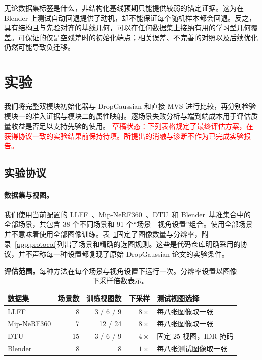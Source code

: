 \documentclass{article}
\newcommand{\PH}[1]{\textcolor{red}{#1}}
\begin{document}
无论数据集标签是什么，非结构化基线预期只能提供较弱的锚定证据。这为在 Blender 上测试自动回退提供了动机，却不能保证每个随机样本都会回退。反之，具有结构且与先验对齐的基线几何，可以在任何数据集上接纳有用的学习型几何覆盖。可保证的仅是空残差时的初始化端点；相关误差、不完善的对照以及后续优化仍然可能导致负迁移。

\section{实验}
\label{sec:exp}

我们将完整双模块初始化器与 DropGaussian 和直接 MVS 进行比较，再分别检验模块一的准入证据与模块二的属性映射。逐场景失败分析与端到端成本用于评估质量收益是否足以支持先验的使用。
\PH{草稿状态：下列表格规定了最终评估方案，在获得协议一致的实验结果前保持待填。所提出的消融与诊断不作为已完成实验报告。}

\subsection{实验协议}
\label{sec:protocol}

\paragraph{数据集与视图。}
我们使用当前配置的 LLFF~\citep{mildenhall2019llff}、Mip-NeRF360~\citep{barron2022mipnerf360}、DTU~\citep{jensen2014large}和 Blender~\citep{mildenhall2020nerf}基准集合中的全部场景，共包含 38 个不同场景和 91 个“场景—视角设置”组合。使用全部场景并不意味着使用全部图像训练。表~\ref{tab:protocol}固定了图像数量与分辨率，附录~\ref{app:protocol}列出了场景和精确的选图规则。这些是代码仓库明确采用的协议，并不声称每一种设置都复现了原始 DropGaussian 论文的实验条件。

\begin{table}[t]
\caption{\textbf{评估范围。}每种方法在每个场景与视角设置下运行一次。分辨率设置以图像下采样倍数表示。}
\label{tab:protocol}
\centering\small
\setlength{\tabcolsep}{4pt}
\begin{tabular}{@{}lrrrl@{}}
\toprule
数据集 & 场景数 & 训练视图数 & 下采样 & 测试视图选择\\
\midrule
LLFF & 8 & 3 / 6 / 9 & $8\times$ & 每八张图像取一张\\
Mip-NeRF360 & 7 & 12 / 24 & $8\times$ & 每八张图像取一张\\
DTU & 15 & 3 / 6 / 9 & $4\times$ & 固定 25 视图，IDR 掩码\\
Blender & 8 & 8 & $1\times$ & 每八张测试图像取一张\\
\bottomrule
\end{tabular}
\end{table}
\end{document}
